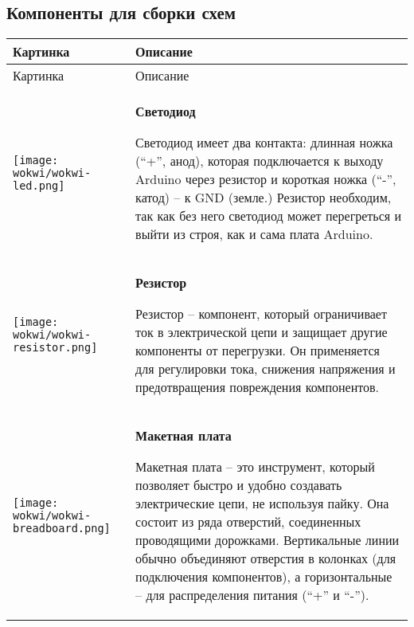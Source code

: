 \documentclass[../sparc.tex]{subfiles}
\begin{document}
\newpage
\subsection{Компоненты для сборки схем}

\begin{longtable}{|>{
      \centering\arraybackslash
    }p{3cm}|>{
      \centering\arraybackslash}p{8cm}|
  }
\hline
Картинка & Описание \\ \hline
\endfirsthead

\hline
Картинка & Описание \\ \hline
\endhead

\hline
\parbox[t][1.4cm][c]{2cm}{\centering \vspace{1cm}
  \texttt{[image: wokwi/wokwi-led.png]}} &
\parbox[t][3cm][t]{8cm}{\centering \textbf{Светодиод}\\ \raggedright

Светодиод имеет два контакта: длинная ножка (``+'', анод), которая подключается
к выходу Arduino через резистор и короткая ножка (``-'', катод) -- к GND (земле.)
Резистор необходим, так как без него светодиод может перегреться и выйти из
строя, как и сама плата Arduino.

} \\  \hline

\parbox[t][0,5cm][c]{2cm}{\centering \vspace{1cm}
  \texttt{[image: wokwi/wokwi-resistor.png]}} &
\parbox[t][2.6cm][t]{8cm}{\centering \textbf{Резистор}\\ \raggedright

Резистор -- компонент, который ограничивает ток в электрической цепи и защищает
другие компоненты от перегрузки.  Он применяется для регулировки тока, снижения
напряжения и предотвращения повреждения компонентов.

} \\  \hline

\parbox[t][2,3cm][c]{2cm}{\centering \vspace{0.8cm}
  \texttt{[image: wokwi/wokwi-breadboard.png]}} &
\parbox[t][3.9cm][t]{8cm}{\centering \textbf{Макетная плата}\\ \raggedright

Макетная плата -- это инструмент, который позволяет быстро и удобно создавать
электрические цепи, не используя пайку.  Она состоит из ряда отверстий,
соединенных проводящими дорожками.  Вертикальные линии обычно объединяют
отверстия в колонках (для подключения компонентов), а горизонтальные -- для
распределения питания (``+'' и ``-'').

}
\end{longtable}
\end{document}
